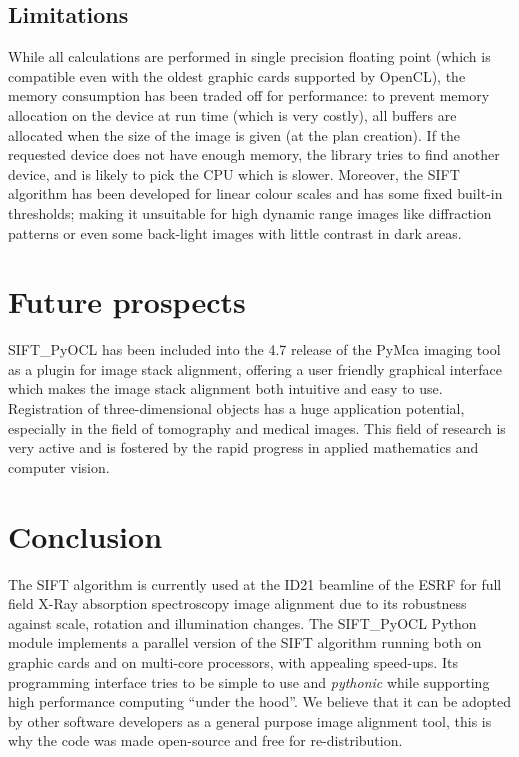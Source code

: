 \documentclass[preprint]{iucr}
\begin{document}
\subsection{Limitations}
While all calculations are performed in single precision floating point
(which is compatible even with the oldest graphic cards supported by OpenCL),
the memory consumption has been traded off for performance: to prevent memory
allocation on the device at run time (which is very costly), all buffers are
allocated when the size of the image is given (at the plan creation). 
If the requested device does not have enough memory, the library tries to find
another device, and is likely to pick the CPU which is slower.
Moreover, the SIFT algorithm has been developed for linear colour scales and
has some fixed built-in thresholds; making it unsuitable for high dynamic
range images like diffraction patterns or even some back-light images with
little contrast in dark areas.


\section{Future prospects}

SIFT\_PyOCL has been included into the 4.7 release of the PyMca imaging tool
\cite{pymca} as a plugin for image stack alignment, offering a user friendly
graphical interface which makes the image stack alignment both intuitive and
easy to use.
Registration of three-dimensional objects has a huge application
potential, especially in the field of tomography and medical images.
This field of research is very active and is fostered by the rapid progress in
applied mathematics and computer vision.


\section{Conclusion}

The SIFT algorithm is currently used at the ID21 beamline of the ESRF for full
field X-Ray absorption spectroscopy image alignment due to its robustness against
scale, rotation and illumination changes.
The SIFT\_PyOCL Python module implements a parallel version of the SIFT
algorithm running both on graphic cards and on multi-core processors, with
appealing speed-ups.
Its programming interface tries to be simple to use and \emph{pythonic} while
supporting high performance computing ``under the hood''.
We believe that it can be adopted by other software developers as a general
purpose image alignment tool, this is why the code was made open-source and free
for re-distribution.
\end{document}
